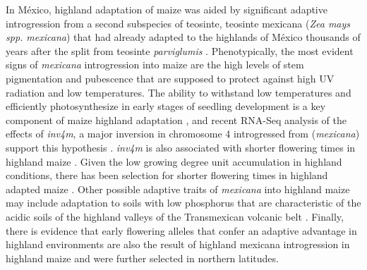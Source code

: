\documentclass[9pt,twocolumn,twoside]{BioRxiv}
\begin{document}
In México, highland adaptation of maize was aided by significant adaptive introgression from a second subspecies of teosinte, teosinte mexicana (\textit{Zea mays spp. mexicana}) that had already adapted to the highlands of México thousands of years after the split from teosinte \textit{parviglumis} \cite{Hufford2013-gs, Gonzalez-Segovia2019-jy}. 
Phenotypically, the most evident signs of \textit{mexicana} introgression into maize are the high levels of stem pigmentation and pubescence \cite{Lauter2004-eq} that are supposed to protect against high UV radiation and low temperatures. 
The ability to withstand low temperatures and efficiently photosynthesize in early stages of seedling development is a key component of maize highland adaptation \cite{Hardacre1980-tq}, and recent RNA-Seq analysis of the effects of \textit{inv4m}, a major inversion in chromosome 4 introgressed from (\textit{mexicana}) support this hypothesis \cite{Crow2020-gene}.
\textit{inv4m} is also associated with shorter flowering times in highland maize \cite{Romero_Navarro2017-cn, Gates2019-xu}. 
Given the low growing degree unit accumulation in highland conditions, there has been selection for shorter flowering times in highland adapted maize \cite{Gates2019-xu}. 
Other possible adaptive traits of \textit{mexicana} into highland maize may include adaptation to soils with low phosphorus \cite{AguirreLiguori2019-fl, Fustier2017-sl} that are characteristic of the acidic soils of the highland valleys of the Transmexican volcanic belt \cite{Krasilnikov2013-sm}.
Finally, there is evidence that early flowering alleles that confer an adaptive advantage in highland environments are also the result of highland mexicana introgression in highland maize \cite{Guo2018-on} and were further selected in northern latitudes.
\end{document}

